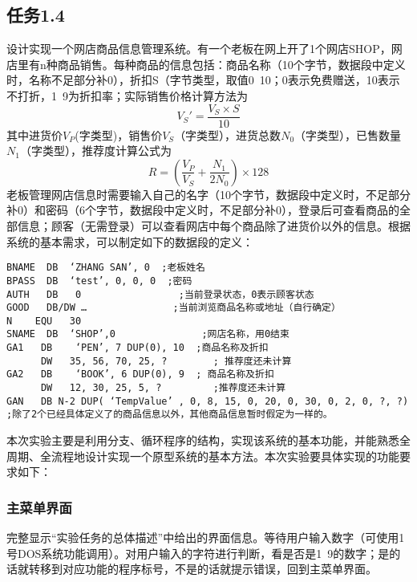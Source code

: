 \documentclass{ctexrep}
\begin{document}
\subsection{任务1.4}
设计实现一个网店商品信息管理系统。有一个老板在网上开了1个网店SHOP，网店里有n种商品销售。每种商品的信息包括：商品名称（10个字节，数据段中定义时，名称不足部分补0），折扣S（字节类型，取值0~10；0表示免费赠送，10表示不打折，1~9为折扣率；实际销售价格计算方法为
\begin{equation}
    V_S'=\frac{V_S\times S}{10}
\end{equation}
其中进货价$V_P$(字类型)，销售价$V_S$（字类型），进货总数$N_0$（字类型），已售数量$N_1$（字类型），推荐度计算公式为
\begin{equation}
    R=(\frac{V_P}{V_S}+\frac{N_1}{2N_0})\times 128
\end{equation}
老板管理网店信息时需要输入自己的名字（10个字节，数据段中定义时，不足部分补0）和密码（6个字节，数据段中定义时，不足部分补0），登录后可查看商品的全部信息；顾客（无需登录）可以查看网店中每个商品除了进货价以外的信息。根据系统的基本需求，可以制定如下的数据段的定义：
\begin{lstlisting}[language={[x86masm]Assembler}]
BNAME  DB  ‘ZHANG SAN’, 0  ;老板姓名
BPASS  DB  ‘test’, 0, 0, 0  ;密码
AUTH   DB   0                 ;当前登录状态，0表示顾客状态
GOOD   DB/DW …               ;当前浏览商品名称或地址（自行确定）
N    EQU   30
SNAME  DB  ‘SHOP’,0               ;网店名称，用0结束
GA1   DB    ‘PEN’, 7 DUP(0), 10  ;商品名称及折扣
      DW   35, 56, 70, 25, ?        ; 推荐度还未计算
GA2   DB    ‘BOOK’, 6 DUP(0), 9  ; 商品名称及折扣
      DW   12, 30, 25, 5, ?         ;推荐度还未计算
GAN   DB N-2 DUP( ‘TempValue’ , 0, 8, 15, 0, 20, 0, 30, 0, 2, 0, ?, ?) ;除了2个已经具体定义了的商品信息以外，其他商品信息暂时假定为一样的。
\end{lstlisting}
本次实验主要是利用分支、循环程序的结构，实现该系统的基本功能，并能熟悉全周期、全流程地设计实现一个原型系统的基本方法。本次实验要具体实现的功能要求如下：
\subsubsection{主菜单界面}
完整显示“实验任务的总体描述”中给出的界面信息。等待用户输入数字（可使用1号DOS系统功能调用）。对用户输入的字符进行判断，看是否是1~9的数字；是的话就转移到对应功能的程序标号，不是的话就提示错误，回到主菜单界面。
\end{document}
